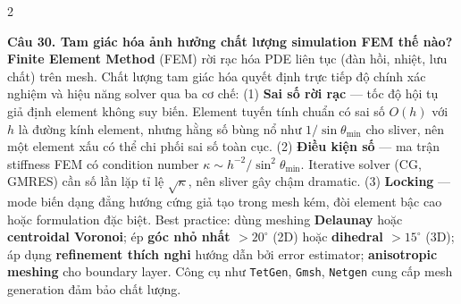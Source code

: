 \begin{paracol}{2}
\switchcolumn

\textbf{Câu 30. Tam giác hóa ảnh hưởng chất lượng simulation FEM thế nào?}\\
\textbf{Finite Element Method} (FEM) rời rạc hóa PDE liên tục (đàn hồi, nhiệt, lưu chất) trên mesh. Chất lượng tam giác hóa quyết định trực tiếp độ chính xác nghiệm và hiệu năng solver qua ba cơ chế: (1) \textbf{Sai số rời rạc} — tốc độ hội tụ giả định element không suy biến. Element tuyến tính chuẩn có sai số $O(h)$ với $h$ là đường kính element, nhưng hằng số bùng nổ như $1/\sin\theta_{\min}$ cho sliver, nên một element xấu có thể chi phối sai số toàn cục. (2) \textbf{Điều kiện số} — ma trận stiffness FEM có condition number $\kappa \sim h^{-2}/\sin^2\theta_{\min}$. Iterative solver (CG, GMRES) cần số lần lặp tỉ lệ $\sqrt{\kappa}$, nên sliver gây chậm dramatic. (3) \textbf{Locking} — mode biến dạng đẳng hướng cứng giả tạo trong mesh kém, đòi element bậc cao hoặc formulation đặc biệt. Best practice: dùng meshing \textbf{Delaunay} hoặc \textbf{centroidal Voronoi}; ép \textbf{góc nhỏ nhất $> 20^\circ$} (2D) hoặc \textbf{dihedral $> 15^\circ$} (3D); áp dụng \textbf{refinement thích nghi} hướng dẫn bởi error estimator; \textbf{anisotropic meshing} cho boundary layer. Công cụ như \texttt{TetGen}, \texttt{Gmsh}, \texttt{Netgen} cung cấp mesh generation đảm bảo chất lượng.

\end{paracol}

